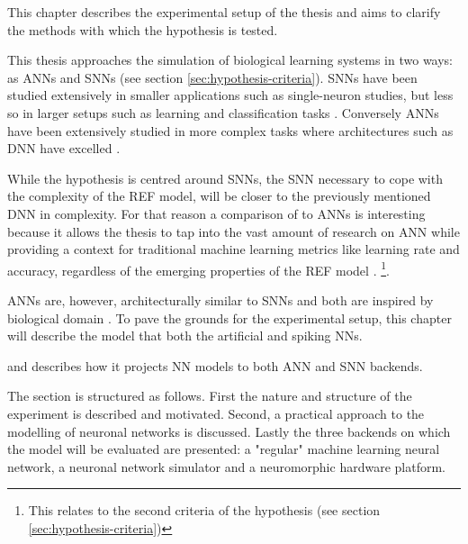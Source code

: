 \documentclass[report.tex]{subfiles}
\begin{document}
This chapter describes the experimental setup of the thesis and aims to clarify the methods with which the hypothesis is tested.

This thesis approaches the simulation of biological learning systems in two ways: as \gls{ANN}s and \gls{SNN}s (see section \ref{sec:hypothesis-criteria}).
\gls{SNN}s have been studied extensively in smaller applications such as single-neuron studies, but less so in larger setups such as learning and classification tasks \autocite{dayan2001, Indiveri2015}.
Conversely \gls{ANN}s have been extensively studied in more complex tasks where architectures such as \gls{DNN} have excelled \autocite{schmidhuber2014, Nilsson2009, russel2007}.

While the hypothesis is centred around \gls{SNN}s, the \gls{SNN} necessary to cope with the complexity of the \gls{REF} model, will be closer to the previously mentioned \gls{DNN} in complexity.
For that reason a comparison of to \gls{ANN}s is interesting because it allows the thesis to tap into the vast amount of research on \gls{ANN} while providing a context for traditional machine learning metrics like learning rate and accuracy, regardless of the emerging properties of the REF model \autocite{schmidhuber2014, russel2007}.
\footnote{This relates to the second criteria of the hypothesis (see section \ref{sec:hypothesis-criteria})}.

\gls{ANN}s are, however, architecturally similar to \gls{SNN}s and both are inspired by biological domain \autocite{Nilsson2009, dayan2001}.
To pave the grounds for the experimental setup, this chapter will describe the model that  both the artificial and spiking \gls{NN}s.

 and describes how it projects \gls{NN} models to both ANN and SNN backends.

The section is structured as follows.
First the nature and structure of the experiment is described and motivated.
Second, a practical approach to the modelling of neuronal networks is discussed.
Lastly the three backends on which the model will be evaluated are presented:
  a "regular" machine learning neural network, a neuronal network simulator and a neuromorphic hardware platform.
\end{document}
